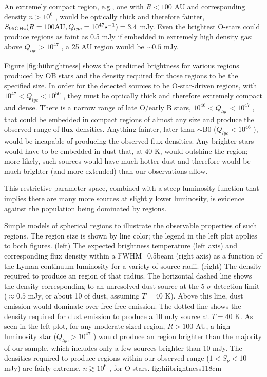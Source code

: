 \documentclass{emulateapj}
\begin{document}
An extremely compact \hii region,
e.g., one with $R<100$ AU and corresponding density $n>10^6$ \percc, would be
optically thick and therefore fainter, $S_{95 \mathrm{GHz}}(R=100 \mathrm{AU},
Q_{lyc}=10^{47} \mathrm{s}^{-1})=3.4$ mJy.  Even the brightest O-stars could produce \hii
regions as faint as 0.5 mJy if embedded in extremely high density gas; above
$Q_{lyc}>10^{47}$ \pers, a 25 AU \hii region would be $\sim0.5$ mJy.

Figure \ref{fig:hiibrightness} shows the predicted brightness for various \hii
regions produced by OB stars and the density required for those \hii regions
to be the specified size.  In
order for the detected sources to be O-star-driven \hii regions, with $10^{47}
< Q_{lyc} < 10^{50}$ \pers, they must be optically thick and therefore
extremely compact and dense.  There is a narrow range of late O/early B stars,
$10^{46} < Q_{lyc} < 10^{47}$ \pers, that could be embedded in compact \hii
regions of almost any size and produce the observed range of flux densities.
Anything fainter, later than $\sim$B0 ($Q_{lyc}<10^{46}$ \pers), would be
incapable of producing the observed flux densities.
Any brighter stars would have to be embedded in dust that, at 40 K, would
outshine the \hii region; more likely, such sources would have much hotter dust
and therefore would be much brighter (and more extended) than our observations
allow.

This restrictive parameter space, combined with a steep luminosity
function that implies there are many more sources at slightly lower luminosity,
is evidence against the population being dominated by \hii regions.

{Simple models of spherical \hii regions to illustrate the observable
properties of such regions.  The \hii region size is shown by line color; the legend
in the left plot applies to both figures.  (left) The expected brightness temperature (left
axis) and corresponding flux density within a FWHM=0.5\arcsec beam (right axis) as a
function of the Lyman continuum luminosity for a variety of source radii.
(right) The density required to produce an \hii region of that radius.  The
horizontal dashed line shows the density corresponding to an unresolved dust
source at the 5-$\sigma$ detection limit ($\approx0.5$ mJy, or about 10 \msun
of dust,
assuming $T=40$ K).  Above this line, dust emission would dominate over
free-free emission.  The dotted line shows the density required for dust
emission to produce a 10 mJy source at $T=40$ K.  
As seen in the left plot, for any moderate-sized \hii region, $R>100$ AU, a high-luminosity
star ($Q_{lyc} > 10^{47}$ \pers) would produce an \hii region brighter than the
majority of our sample, which includes only a few sources brighter than 10 mJy.
The densities required to produce \hii regions within our observed range
($1<S_\nu<10$ mJy) are fairly extreme, $n\gtrsim10^6$ \percc, for O-stars.}
{fig:hiibrightness}{1}{18cm}
\end{document}

